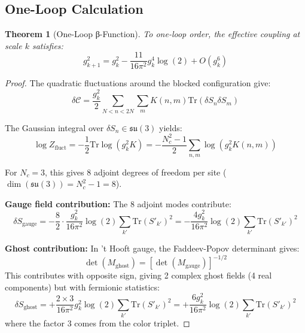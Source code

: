 \documentclass[11pt]{article}
\numberwithin{equation}{section}
\newtheorem{theorem}{Theorem}[section]
\theoremstyle{definition}
\theoremstyle{remark}
\begin{document}
\subsection{One-Loop Calculation}

\begin{theorem}[One-Loop β-Function]
To one-loop order, the effective coupling at scale $k$ satisfies:
\begin{equation}
g_{k+1}^2 = g_k^2 - \frac{11}{16\pi^2} g_k^4 \log(2) + O(g_k^6)
\end{equation}
\end{theorem}

\begin{proof}
The quadratic fluctuations around the blocked configuration give:
\begin{equation}
\delta \mathcal{C} = \frac{g_k^2}{2} \sum_{N < n < 2N} \sum_m K(n,m) \text{Tr}(\delta S_n \delta S_m)
\end{equation}

The Gaussian integral over $\delta S_n \in \mathfrak{su}(3)$ yields:
\begin{equation}
\log Z_{\text{fluct}} = -\frac{1}{2} \text{Tr} \log(g_k^2 K) = -\frac{N_c^2 - 1}{2} \sum_{n,m} \log(g_k^2 K(n,m))
\end{equation}

For $N_c = 3$, this gives 8 adjoint degrees of freedom per site ($\dim(\mathfrak{su}(3)) = N_c^2 - 1 = 8$).

\textbf{Gauge field contribution:} The 8 adjoint modes contribute:
\begin{equation}
\delta S_{\text{gauge}} = -\frac{8}{2} \cdot \frac{g_k^2}{16\pi^2} \log(2) \sum_{k'} \text{Tr}(S'_{k'})^2 = -\frac{4g_k^2}{16\pi^2} \log(2) \sum_{k'} \text{Tr}(S'_{k'})^2
\end{equation}

\textbf{Ghost contribution:} In 't Hooft gauge, the Faddeev-Popov determinant gives:
\begin{equation}
\det(M_{\text{ghost}}) = [\det(M_{\text{gauge}})]^{-1/2}
\end{equation}
This contributes with opposite sign, giving 2 complex ghost fields (4 real components) but with fermionic statistics:
\begin{equation}
\delta S_{\text{ghost}} = +\frac{2 \times 3}{16\pi^2} g_k^2 \log(2) \sum_{k'} \text{Tr}(S'_{k'})^2 = +\frac{6g_k^2}{16\pi^2} \log(2) \sum_{k'} \text{Tr}(S'_{k'})^2
\end{equation}
where the factor 3 comes from the color triplet.


\end{proof}
\end{document}
